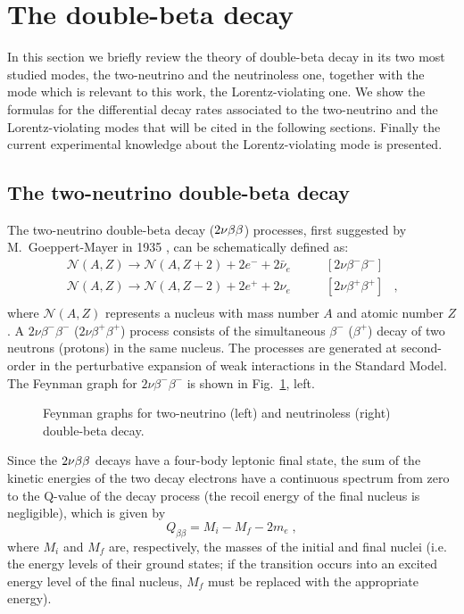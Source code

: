 \section{The double-beta decay}\label{sec:theory}
In this section we briefly review the theory of double-beta decay in its two most studied modes, the two-neutrino and the neutrinoless one, together with the mode which is relevant to this work, the Lorentz-violating one. We show the formulas for the differential decay rates associated to the two-neutrino and the Lorentz-violating modes that will be cited in the following sections. Finally the current experimental knowledge about the Lorentz-violating mode is presented.
\subsection*{The two-neutrino double-beta decay}
The two-neutrino double-beta decay ($2\nu\beta\beta$) processes, first suggested by M.~Goeppert-Mayer in 1935 \cite{PhysRev.48.512}, can be schematically defined as:
\[\begin{array}{lrl}
		\mathcal{N}(A,Z)\longrightarrow \mathcal{N}(A,Z+2)+2e^-+2\bar{\nu}_e & \qquad [2\nu\beta^-\beta^-] & \\
		\mathcal{N}(A,Z)\longrightarrow \mathcal{N}(A,Z-2)+2e^++2\nu_e & \qquad [2\nu\beta^+\beta^+] & ,\\
\end{array}\]
where $\mathcal{N}(A,Z)$ represents a nucleus with mass number $A$ and atomic number $Z$. A $2\nu\beta^-\beta^-$ ($2\nu\beta^+\beta^+$) process consists of the simultaneous $\beta^-$ ($\beta^+$) decay of two neutrons (protons) in the same nucleus. The processes are generated at second-order in the perturbative expansion of weak interactions in the Standard Model. The Feynman graph for $2\nu\beta^-\beta^-$ is shown in Fig.~\ref{fig:nbbfey}, left.
\begin{figure}[b]
	\centering%
	\caption{Feynman graphs for two-neutrino (left) and neutrinoless (right) double-beta decay.}
	\label{fig:nbbfey}
\end{figure}

Since the $2\nu\beta\beta$ decays have a four-body leptonic final state, the sum of the kinetic energies of the two decay electrons have a continuous spectrum from zero to the Q-value of the decay process (the recoil energy of the final nucleus is negligible), which is given by
\begin{equation}Q_{\beta\beta}=M_i-M_f-2m_e\;,\end{equation}
where $M_i$ and $M_f$ are, respectively, the masses of the initial and final nuclei (i.e. the energy levels of their ground states; if the transition occurs into an excited energy level of the final nucleus, $M_f$ must be replaced with the appropriate energy).

